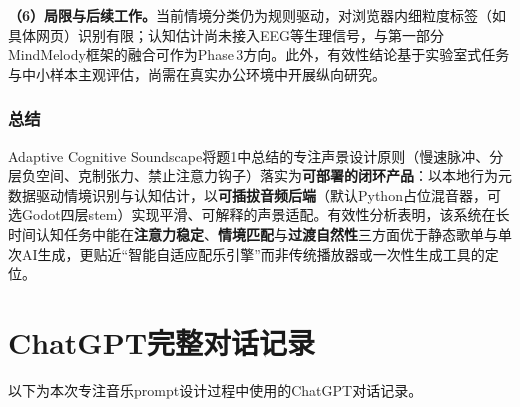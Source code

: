 \documentclass[12pt, fontset=windows]{ctexart}
\begin{document}
\textbf{（6）局限与后续工作。}当前情境分类仍为规则驱动，对浏览器内细粒度标签（如具体网页）识别有限；认知估计尚未接入EEG等生理信号，与第一部分MindMelody框架的融合可作为Phase\,3方向。此外，有效性结论基于实验室式任务与中小样本主观评估，尚需在真实办公环境中开展纵向研究。

\subsubsection{总结}

Adaptive Cognitive Soundscape将题1中总结的专注声景设计原则（慢速脉冲、分层负空间、克制张力、禁止注意力钩子）落实为\textbf{可部署的闭环产品}：以本地行为元数据驱动情境识别与认知估计，以\textbf{可插拔音频后端}（默认Python占位混音器，可选Godot四层stem）实现平滑、可解释的声景适配。有效性分析表明，该系统在长时间认知任务中能在\textbf{注意力稳定}、\textbf{情境匹配}与\textbf{过渡自然性}三方面优于静态歌单与单次AI生成，更贴近“智能自适应配乐引擎”而非传统播放器或一次性生成工具的定位。

\clearpage
\appendix
\section{ChatGPT完整对话记录}

以下为本次专注音乐prompt设计过程中使用的ChatGPT对话记录。

\end{document}

